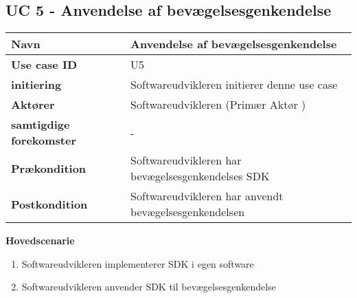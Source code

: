 \subsection{UC 5 - Anvendelse af bevægelsesgenkendelse}
\begin{table}[htbp] 
	\begin{tabular}{|p{5cm}|p{9cm}|}
		\hline
		\textbf{Navn} & Anvendelse af bevægelsesgenkendelse \\ \hline
		\textbf{Use case ID} & U5 \\ \hline
		\textbf{initiering} & Softwareudvikleren initierer denne use case \\ \hline
		\textbf{Aktører} & Softwareudvikleren (Primær Aktør ) \\ \hline
		\textbf{samtigdige forekomster} & - \\ \hline
		\textbf{Prækondition} & Softwareudvikleren har bevægelsesgenkendelses SDK\\ \hline
		\textbf{Postkondition} & Softwareudvikleren har anvendt bevægelsesgenkendelsen\\ \hline
	\end{tabular}
\end{table}
\textbf{Hovedscenarie}
\begin{enumerate}
	\item Softwareudvikleren implementerer SDK i egen software
	\item Softwareudvikleren anvender SDK til bevægelsesgenkendelse
\end{enumerate}

